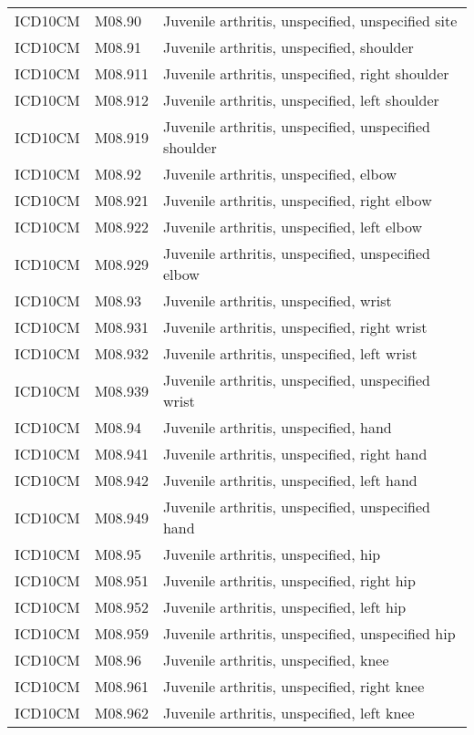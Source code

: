 \begin{table}[ht]
\begin{tabular}{lll}
  ICD10CM & M08.90 & Juvenile arthritis, unspecified, unspecified site \\ 
  ICD10CM & M08.91 & Juvenile arthritis, unspecified, shoulder \\ 
  ICD10CM & M08.911 & Juvenile arthritis, unspecified, right shoulder \\ 
  ICD10CM & M08.912 & Juvenile arthritis, unspecified, left shoulder \\ 
  ICD10CM & M08.919 & Juvenile arthritis, unspecified, unspecified shoulder \\ 
  ICD10CM & M08.92 & Juvenile arthritis, unspecified, elbow \\ 
  ICD10CM & M08.921 & Juvenile arthritis, unspecified, right elbow \\ 
  ICD10CM & M08.922 & Juvenile arthritis, unspecified, left elbow \\ 
  ICD10CM & M08.929 & Juvenile arthritis, unspecified, unspecified elbow \\ 
  ICD10CM & M08.93 & Juvenile arthritis, unspecified, wrist \\ 
  ICD10CM & M08.931 & Juvenile arthritis, unspecified, right wrist \\ 
  ICD10CM & M08.932 & Juvenile arthritis, unspecified, left wrist \\ 
  ICD10CM & M08.939 & Juvenile arthritis, unspecified, unspecified wrist \\ 
  ICD10CM & M08.94 & Juvenile arthritis, unspecified, hand \\ 
  ICD10CM & M08.941 & Juvenile arthritis, unspecified, right hand \\ 
  ICD10CM & M08.942 & Juvenile arthritis, unspecified, left hand \\ 
  ICD10CM & M08.949 & Juvenile arthritis, unspecified, unspecified hand \\ 
  ICD10CM & M08.95 & Juvenile arthritis, unspecified, hip \\ 
  ICD10CM & M08.951 & Juvenile arthritis, unspecified, right hip \\ 
  ICD10CM & M08.952 & Juvenile arthritis, unspecified, left hip \\ 
  ICD10CM & M08.959 & Juvenile arthritis, unspecified, unspecified hip \\ 
  ICD10CM & M08.96 & Juvenile arthritis, unspecified, knee \\ 
  ICD10CM & M08.961 & Juvenile arthritis, unspecified, right knee \\ 
  ICD10CM & M08.962 & Juvenile arthritis, unspecified, left knee \\ 

\end{tabular}
\end{table}
